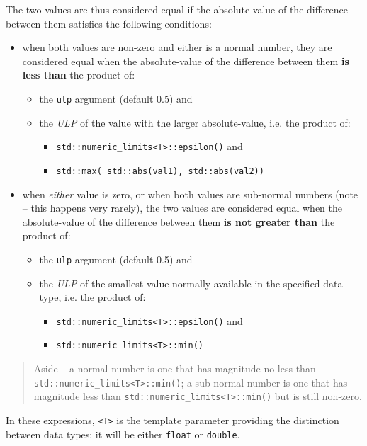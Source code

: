 \documentclass[11pt,fleqn]{report}
\begin{document}
The two values are thus considered equal if the absolute-value of the
difference between them satisfies the following conditions:
\begin{itemize}
\item when both values are non-zero and either is a normal number, they
are considered equal when the absolute-value of the difference
between them \textbf{is less than} the product of:
\begin{itemize}
\item the \texttt{ulp} argument (default 0.5) and
\item the \textit{ULP} of the value with
the larger absolute-value, i.e. the product of:
\begin{itemize}
\item \texttt{std::numeric\_limits<T>::epsilon()} and
\item \texttt{std::max( std::abs(val1), std::abs(val2))}
\end{itemize}
\end{itemize}
\item when \textit{either} value is zero, or when both values are
sub-normal numbers (note -- this happens very rarely),
the two
values are considered equal when the absolute-value of the difference
between them \textbf{is not greater than} the product of:
\begin{itemize}
\item the \texttt{ulp} argument (default 0.5) and
\item the \textit{ULP} of the smallest value normally available in
the specified data type, i.e. the product of:
\begin{itemize}
\item \texttt{std::numeric\_limits<T>::epsilon()} and
\item \texttt{std::numeric\_limits<T>::min()}
\end{itemize}
\end{itemize}
\end{itemize}
\begin{quote}
Aside -- a normal number is one that has magnitude no less than \newline
\texttt{std::numeric\_limits<T>::min()}; a sub-normal number is one that
has magnitude \newline less than
\texttt{std::numeric\_limits<T>::min()} but is still non-zero.
\end{quote}

In these expressions, \texttt{<T>} is the template parameter providing the
distinction between data types; it will be either \texttt{float} or
\texttt{double}.
\end{document}
